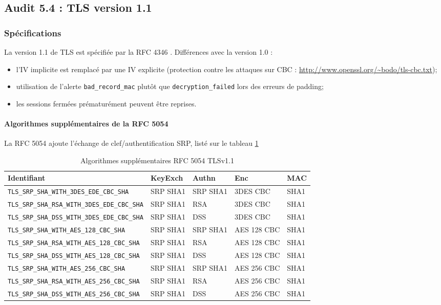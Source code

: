 \subsection{Audit 5.4 : TLS version 1.1}
\subsubsection{Spécifications}

La version 1.1 de TLS est spécifiée par la RFC 4346 \cite{rfc4346}. Différences avec la version 1.0 :
\begin{itemize}
\item l'IV implicite est remplacé par une IV explicite (protection contre les attaques sur CBC : \url{http://www.openssl.org/~bodo/tls-cbc.txt});
\item utilisation de l'alerte \verb+bad_record_mac+ plutôt que \verb+decryption_failed+ lors des erreurs de padding;
\item les sessions fermées prématurément peuvent être reprises.
\end{itemize}

\paragraph{Algorithmes supplémentaires de la RFC 5054} 
La RFC 5054 \cite{rfc5054} ajoute l'échange de clef/authentification SRP, listé sur le tableau \ref{algosTLS1.1RFC5054}

\begin{table}
\centering
\begin{tabularx}{17cm}{|l|l|l|X|l|}
\hline
\textbf{Identifiant} & \textbf{KeyExch} & \textbf{Authn}& \textbf{Enc}& \textbf{MAC}\\
\hline
\verb+TLS_SRP_SHA_WITH_3DES_EDE_CBC_SHA+&SRP SHA1&SRP SHA1&3DES CBC&SHA1\\
\hline
\verb+TLS_SRP_SHA_RSA_WITH_3DES_EDE_CBC_SHA+&SRP SHA1&RSA&3DES CBC&SHA1\\
\hline
\verb+TLS_SRP_SHA_DSS_WITH_3DES_EDE_CBC_SHA+&SRP SHA1&DSS&3DES CBC&SHA1\\
\hline
\verb+TLS_SRP_SHA_WITH_AES_128_CBC_SHA+&SRP SHA1&SRP SHA1&AES 128 CBC&SHA1\\
\hline
\verb+TLS_SRP_SHA_RSA_WITH_AES_128_CBC_SHA+&SRP SHA1&RSA&AES 128 CBC&SHA1\\
\hline
\verb+TLS_SRP_SHA_DSS_WITH_AES_128_CBC_SHA+&SRP SHA1&DSS&AES 128 CBC&SHA1\\
\hline
\verb+TLS_SRP_SHA_WITH_AES_256_CBC_SHA+&SRP SHA1&SRP SHA1&AES 256 CBC&SHA1\\
\hline
\verb+TLS_SRP_SHA_RSA_WITH_AES_256_CBC_SHA+&SRP SHA1&RSA&AES 256 CBC&SHA1\\
\hline
\verb+TLS_SRP_SHA_DSS_WITH_AES_256_CBC_SHA+&SRP SHA1&DSS&AES 256 CBC&SHA1\\
\hline
\end{tabularx}
\caption{Algorithmes supplémentaires RFC 5054 TLSv1.1}
\label{algosTLS1.1RFC5054}
\end{table}

